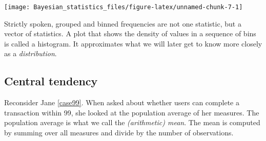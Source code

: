 \documentclass[]{svmono}
\newenvironment{Shaded}{\begin{snugshade}}{\end{snugshade}}
\newcommand{\KeywordTok}[1]{\textcolor[rgb]{0.13,0.29,0.53}{\textbf{#1}}}
\newcommand{\DataTypeTok}[1]{\textcolor[rgb]{0.13,0.29,0.53}{#1}}
\newcommand{\DecValTok}[1]{\textcolor[rgb]{0.00,0.00,0.81}{#1}}
\newcommand{\StringTok}[1]{\textcolor[rgb]{0.31,0.60,0.02}{#1}}
\newcommand{\CommentTok}[1]{\textcolor[rgb]{0.56,0.35,0.01}{\textit{#1}}}
\newcommand{\ControlFlowTok}[1]{\textcolor[rgb]{0.13,0.29,0.53}{\textbf{#1}}}
\newcommand{\OperatorTok}[1]{\textcolor[rgb]{0.81,0.36,0.00}{\textbf{#1}}}
\newcommand{\NormalTok}[1]{#1}
\begin{document}
\begin{Shaded}
\end{Shaded}

\texttt{[image: Bayesian\_statistics\_files/figure-latex/unnamed-chunk-7-1]}

\begin{Shaded}
\end{Shaded}

Strictly spoken, grouped and binned frequencies are not one statistic,
but a vector of statistics. A plot that shows the density of values in a
sequence of bins is called a histogram. It approximates what we will
later get to know more closely as a \emph{distribution}.

\subsection{Central tendency}\label{central-tendency}

Reconsider Jane \ref{case99}. When asked about whether users can
complete a transaction within 99, she looked at the population average
of her measures. The population average is what we call the
\emph{(arithmetic) mean}. The mean is computed by summing over all
measures and divide by the number of observations.
\end{document}
